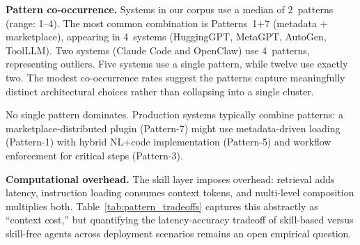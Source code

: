 \documentclass[conference, compsoc]{IEEEtran}
\theoremstyle{plain}
\newcommand{\para}[1]{\smallskip\noindent\textbf{#1.}}
\begin{document}
\begin{table}[t]
\centering
\caption{Pattern trade-off summary across four dimensions. H = High, M = Medium, L = Low.}
\label{tab:pattern_tradeoffs}
\end{table}



\para{Pattern co-occurrence} Systems in our corpus use a median of 2~patterns (range: 1--4). The most common combination is Patterns~1+7 (metadata + marketplace), appearing in 4~systems (HuggingGPT, MetaGPT, AutoGen, ToolLLM). Two systems (Claude Code and OpenClaw) use 4~patterns, representing outliers. Five systems use a single pattern, while twelve use exactly two. The modest co-occurrence rates suggest the patterns capture meaningfully distinct architectural choices rather than collapsing into a single cluster.

No single pattern dominates. Production systems typically combine patterns: a marketplace-distributed plugin (Pattern-7) might use metadata-driven loading (Pattern-1) with hybrid NL+code implementation (Pattern-5) and workflow enforcement for critical steps (Pattern-3).

\para{Computational overhead} The skill layer imposes overhead: retrieval adds latency, instruction loading consumes context tokens, and multi-level composition multiplies both. Table~\ref{tab:pattern_tradeoffs} captures this abstractly as ``context cost,'' but quantifying the latency-accuracy tradeoff of skill-based versus skill-free agents across deployment scenarios remains an open empirical question.

\end{document}
